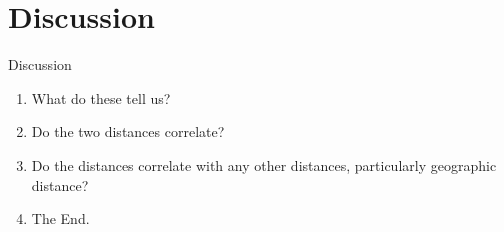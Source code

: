 \documentclass[11pt]{article}
\begin{document}
\section{Discussion}

Discussion
  \begin{enumerate}
  \item What do these tell us?
  \item Do the two distances correlate?
  \item Do the distances correlate with any other distances,
    particularly geographic distance?
  \item The End.
  \end{enumerate}


\end{document}
